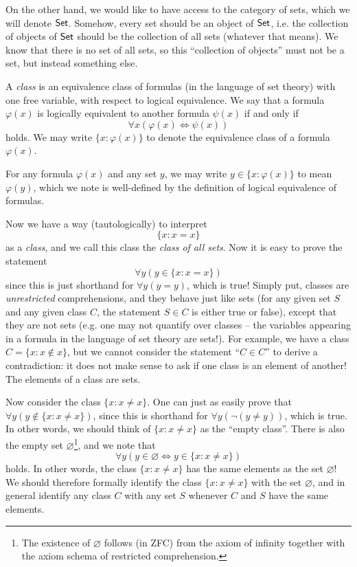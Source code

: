 On the other hand, we would like to have access to the category of sets, which we will denote $\mathsf{Set}$. Somehow, every set should be an object of $\mathsf{Set}$, i.e. the collection of objects of $\mathsf{Set}$ should be the collection of all sets (whatever that means). We know that there is no set of all sets, so this ``collection of objects'' must not be a set, but instead something else.

\begin{definition}\label{def:appendix:size issues:class}
    A \emph{class} is an equivalence class of formulas (in the language of set theory) with one free variable, with respect to logical equivalence. We say that a formula $\varphi(x)$ is logically equivalent to another formula $\psi(x)$ if and only if
    \[\forall x (\varphi(x) \iff \psi(x))\]
    holds. We may write $\{x : \varphi(x)\}$ to denote the equivalence class of a formula $\varphi(x)$.

    For any formula $\varphi(x)$ and any set $y$, we may write $y \in \{x : \varphi(x)\}$ to mean $\varphi(y)$, which we note is well-defined by the definition of logical equivalence of formulas.
\end{definition}

Now we have a way (tautologically) to interpret
\[\{x : x = x\}\]
as a \emph{class}, and we call this class the \emph{class of all sets}. Now it is easy to prove the statement
\[\forall y (y \in \{x : x  = x\})\]
since this is just shorthand for $\forall y (y = y)$, which is true! Simply put, classes are \emph{unrestricted} comprehensions, and they behave just like sets (for any given set $S$ and any given class $C$, the statement $S \in C$ is either true or false), except that they are not sets (e.g. one may not quantify over classes -- the variables appearing in a formula in the language of set theory are sets!). For example, we have a class $C = \{x : x \notin x\}$, but we cannot consider the statement ``$C \in C$'' to derive a contradiction: it does not make sense to ask if one class is an element of another! The elements of a class are sets.

Now consider the class $\{x : x \neq x\}$. One can just as easily prove that $\forall y (y \notin \{x : x \neq x\})$, since this is shorthand for $\forall y(\lnot (y \neq y))$, which is true. In other words, we should think of $\{x : x \neq x\}$ as the ``empty class''. There is also the empty set $\varnothing$\footnote{The existence of $\varnothing$ follows (in ZFC) from the axiom of infinity together with the axiom schema of restricted comprehension.}, and we note that
\[\forall y (y \in \varnothing \iff y \in \{x : x \neq x\})\]
holds. In other words, the class $\{x : x \neq x\}$ has the same elements as the set $\varnothing$! We should therefore formally identify the class $\{x : x \neq x\}$ with the set $\varnothing$, and in general identify any class $C$ with any set $S$ whenever $C$ and $S$ have the same elements.


